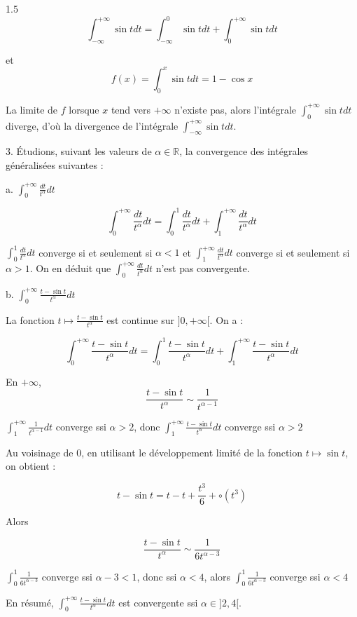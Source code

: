 \documentclass[12pt]{article}
\begin{document}
\begin{spacing}{1.5}
\[\int_{-\infty}^{+\infty}\sin t dt=\int_{-\infty}^{0}\sin t dt+\int_{0}^{+\infty}\sin t dt\]

et \[f(x)=\int_{0}^{x}\sin t dt=1-\cos x\]

La limite de $f$ lorsque $x$ tend vers $+\infty$ n'existe pas, alors l'intégrale $\int_{0}^{+\infty}\sin t dt$ diverge, d'où la divergence de l'intégrale $\int_{-\infty}^{+\infty}\sin t dt$.

3. Étudions, suivant les valeurs de $\alpha\in\mathbb{R}$, la convergence des intégrales généralisées suivantes :

a. $\int_0^{+\infty}\frac{dt}{t^{\alpha}}dt$


\[\int_0^{+\infty}\frac{dt}{t^{\alpha}}dt=\int_0^{1}\frac{dt}{t^{\alpha}}dt+\int_1^{+\infty}\frac{dt}{t^{\alpha}}dt\]

$\int_0^{1}\frac{dt}{t^{\alpha}}dt$ converge si et seulement si $\alpha<1$ et $\int_1^{+\infty}\frac{dt}{t^{\alpha}}dt$ converge si et seulement si $\alpha>1$. On en déduit que $\int_0^{+\infty}\frac{dt}{t^{\alpha}}dt$ n'est pas convergente.

b. $\int_0^{+\infty}\frac{t-\sin t}{t^{\alpha}}dt$

La fonction $t\mapsto \frac{t-\sin t}{t^{\alpha}}$ est continue sur $]0,+\infty[$. On a :

\[\int_0^{+\infty}\frac{t-\sin t}{t^{\alpha}}dt=\int_0^{1}\frac{t-\sin t}{t^{\alpha}}dt+\int_1^{+\infty}\frac{t-\sin t}{t^{\alpha}}dt\]

\medskip
En $+\infty$, \[\frac{t-\sin t}{t^{\alpha}}\sim \frac{1}{t^{\alpha-1}}\]

$\int_1^{+\infty}\frac{1}{t^{\alpha-1}}dt$ converge ssi $\alpha>2$, donc $\int_1^{+\infty}\frac{t-\sin t}{t^{\alpha}}dt$ converge ssi $\alpha>2$

\medskip
Au voisinage de 0, en utilisant le développement limité de la fonction $t\mapsto \sin t$, on obtient :

\[t-\sin t=t-t+\frac{t^3}{6} + \circ(t^3)\]

Alors

\[\frac{t-\sin t}{t^{\alpha}}\sim \frac{1}{6t^{\alpha-3}}\]

$\int_0^{1}\frac{1}{6t^{\alpha-3}}$ converge ssi $\alpha-3<1$, donc ssi $\alpha<4$, alors $\int_0^{1}\frac{1}{6t^{\alpha-3}}$ converge ssi $\alpha<4$

En résumé, $\int_0^{+\infty}\frac{t-\sin t}{t^{\alpha}}dt$ est convergente ssi $\alpha\in ]2,4[$.




\end{spacing}
\end{document}

